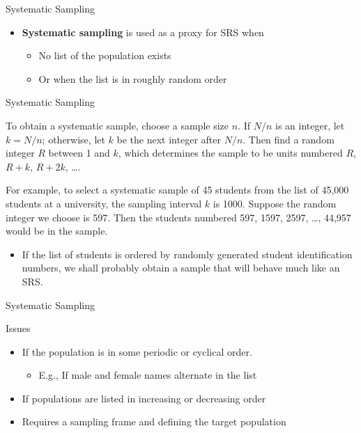\documentclass[10pt]{beamer}\usepackage[]{graphicx}\usepackage[]{xcolor}
\begin{document}
\begin{frame}{Systematic Sampling}
\begin{block}{}
\begin{itemize}
\item \textbf{Systematic sampling} is used as a proxy for SRS when 
\begin{itemize}
\item No list of the population exists
\item Or when the list is in roughly random order
\end{itemize}
\end{itemize}
\end{block}
\end{frame}

\begin{frame}{Systematic Sampling}
\begin{block}{}
To obtain a systematic sample, choose a sample size $n$. If $N/n$ is an integer, let $k=N/n$; otherwise, let $k$ be the next integer after $N/n$. Then find a random integer $R$ between 1 and $k$, which determines the sample to be units numbered $R$, $R+k$, $R+2k$, \dots.
\end{block}

\begin{block}{}
For example, to select a systematic sample of 45 students from the list of 45,000 students at a university, the sampling interval $k$ is 1000. Suppose the random integer we choose is 597. Then the students numbered 597, 1597, 2597, \dots, 44,957 would be in the sample.

\begin{itemize}
\item If the list of students is ordered by randomly generated student identification numbers, we shall probably obtain a sample that will behave much like an SRS.
\end{itemize}

\end{block}

\end{frame}

\begin{frame}{Systematic Sampling}
\begin{block}{Issues}
\begin{itemize}
\item If the population is in some periodic or cyclical order.
\begin{itemize}
\item E.g., If male and female names alternate in the list
\end{itemize}
\item If populations are listed in increasing or decreasing order
\item Requires a sampling frame and defining the target population
\end{itemize}
\end{block}
\end{frame}
\end{document}
